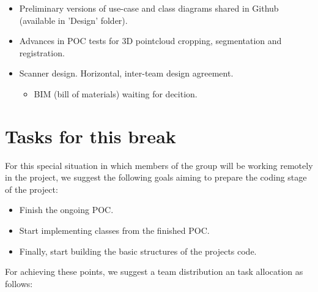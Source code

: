 \documentclass[11pt]{article} %
\begin{document}
\begin{itemize}
\item Preliminary versions of use-case and class diagrams shared in Github (available in 'Design' folder).
\item Advances in POC tests for 3D pointcloud cropping, segmentation and registration.
\item Scanner design. Horizontal, inter-team design agreement.
		\begin{itemize}
		\item BIM (bill of materials) waiting for decition.
	\end{itemize}  
\end{itemize}  	

\section{Tasks for this break}
For this special situation in which members of the group will be working remotely in the project,  we suggest the following goals 
aiming to prepare the coding stage of the project:
\begin{itemize}
\item Finish the ongoing POC. 
\item Start implementing classes from the finished POC.
\item Finally, start building the basic structures of the projects code.

\end{itemize}


For achieving these points, we suggest a team distribution an task allocation as follows:\\\\
\end{document}
